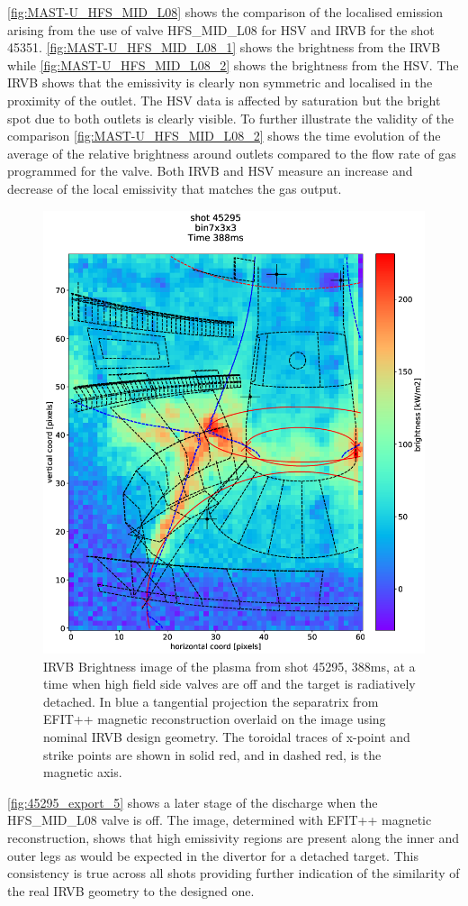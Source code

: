 \autoref{fig:MAST-U_HFS_MID_L08} shows the comparison of the localised emission arising from the use of valve HFS\_MID\_L08 for HSV and IRVB for the shot 45351. \autoref{fig:MAST-U_HFS_MID_L08_1} shows the brightness from the IRVB while \autoref{fig:MAST-U_HFS_MID_L08_2} shows the brightness from the HSV. The IRVB shows that the emissivity is clearly non symmetric and localised in the proximity of the outlet. The HSV data is affected by saturation but the bright spot due to both outlets is clearly visible. To further illustrate the validity of the comparison \autoref{fig:MAST-U_HFS_MID_L08_2} shows the time evolution of the average of the relative brightness around outlets compared to the flow rate of gas programmed for the valve. Both IRVB and HSV measure an increase and decrease of the local emissivity that matches the gas output.

\begin{figure}
	\centering
	\includegraphics[width=0.65\linewidth,trim={0 0 0 20},clip]{Chapters/chapter2/figs/IRVB-MASTU_shot-45295_export_5.png}
	\caption{IRVB Brightness image of the plasma from shot 45295, 388ms, at a time when high field side valves are off and the target is radiatively detached. In blue a tangential projection the separatrix from EFIT++ magnetic reconstruction overlaid on the image using nominal IRVB design geometry. The toroidal traces of x-point and strike points are shown in solid red, and in dashed red, is the magnetic axis.}
	\label{fig:45295_export_5}
\end{figure}

\autoref{fig:45295_export_5} shows a later stage of the discharge when the HFS\_MID\_L08 valve is off. The image, determined with EFIT++ magnetic reconstruction\cite{Lao1985}, shows that high emissivity regions are present along the inner and outer legs as would be expected in the divertor for a detached target. This consistency is true across all shots providing further indication of the similarity of the real IRVB geometry to the designed one.%

